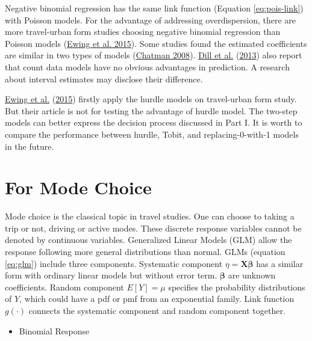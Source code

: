 \documentclass[
  11pt,
  openany]{memoir}
\providecommand{\tightlist}{%
  \setlength{\itemsep}{0pt}\setlength{\parskip}{0pt}}
\begin{document}
Negative binomial regression has the same link function (Equation \eqref{eq:pois-link}) with Poisson models.
For the advantage of addressing overdispersion, there are more travel-urban form studies choosing negative binomial regression than Poisson models (\protect\hyperlink{ref-ewingVaryingInfluencesBuilt2015}{Ewing et al. 2015}). Some studies found the estimated coefficients are similar in two types of models (\protect\hyperlink{ref-chatmanDeconstructingDevelopmentDensity2008}{Chatman 2008}).
\protect\hyperlink{ref-dillPredictingTransitRidership2013}{Dill et al.} (\protect\hyperlink{ref-dillPredictingTransitRidership2013}{2013}) also report that count data models have no obvious advantages in prediction.
A research about interval estimates may disclose their difference.

\protect\hyperlink{ref-ewingVaryingInfluencesBuilt2015}{Ewing et al.} (\protect\hyperlink{ref-ewingVaryingInfluencesBuilt2015}{2015}) firstly apply the hurdle models on travel-urban form study. But their article is not for testing the advantage of hurdle model.
The two-step models can better express the decision process discussed in Part I.
It is worth to compare the performance between hurdle, Tobit, and replacing-0-with-1 models in the future.

\hypertarget{for-mode-choice}{%
\section{For Mode Choice}\label{for-mode-choice}}

Mode choice is the classical topic in travel studies.
One can choose to taking a trip or not, driving or active modes. These discrete response variables cannot be denoted by continuous variables.
Generalized Linear Models (GLM) allow the response following more general distributions than normal.
GLMs (equation \eqref{eq:glm}) include three components.
Systematic component \(\eta=\mathbf{X}\boldsymbol\beta\) has a similar form with ordinary linear models but without error term. \(\boldsymbol\beta\) are unknown coefficients.
Random component \(E[Y]=\mu\) specifies the probability distributions of \(Y\), which could have a pdf or pmf from an exponential family.
Link function \(g(\cdot)\) connects the systematic component and random component together.

\begin{itemize}
\tightlist
\item
  Binomial Response
\end{itemize}
\end{document}
